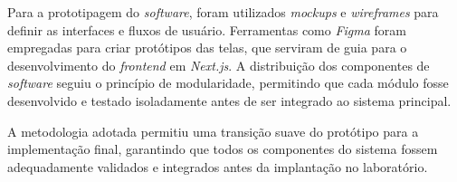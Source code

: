 \newpage

Para a prototipagem do \textit{software}, foram utilizados \textit{mockups} e \textit{wireframes} para definir as interfaces e fluxos de usuário. Ferramentas como \textit{Figma} foram empregadas para criar protótipos das telas, que serviram de guia para o desenvolvimento do \textit{frontend} em \textit{Next.js}. A distribuição dos componentes de \textit{software} seguiu o princípio de modularidade, permitindo que cada módulo fosse desenvolvido e testado isoladamente antes de ser integrado ao sistema principal.

A metodologia adotada permitiu uma transição suave do protótipo para a implementação final, garantindo que todos os componentes do sistema fossem adequadamente validados e integrados antes da implantação no laboratório.